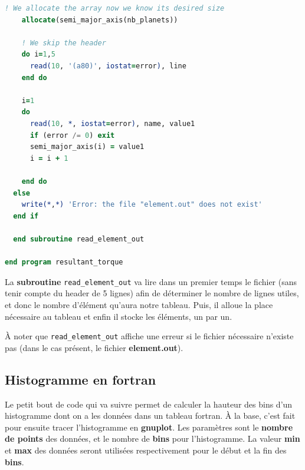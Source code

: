 \documentclass[a4paper,twoside]{article}
\begin{document}
\begin{lstlisting}[language=Fortran]
    ! We allocate the array now we know its desired size
    allocate(semi_major_axis(nb_planets))
    
    ! We skip the header
    do i=1,5
      read(10, '(a80)', iostat=error), line
    end do
    
    i=1
    do
      read(10, *, iostat=error), name, value1
      if (error /= 0) exit
      semi_major_axis(i) = value1
      i = i + 1
    
    end do
  else
    write(*,*) 'Error: the file "element.out" does not exist'
  end if
  
  end subroutine read_element_out

end program resultant_torque
\end{lstlisting}
La \textbf{subroutine} \texttt{read\_element\_out} va lire dans un premier temps le fichier (sans tenir compte du header de 5 lignes) afin de déterminer le nombre de lignes utiles, et donc le nombre d'élément qu'aura notre tableau. Puis, il alloue la place nécessaire au tableau et enfin il stocke les éléments, un par un.

À noter que \texttt{read\_element\_out} affiche une erreur si le fichier nécessaire n'existe pas (dans le cas présent, le fichier \textbf{element.out}).

\subsection{Histogramme en fortran}
Le petit bout de code qui va suivre permet de calculer la hauteur des bins d'un histogramme dont on a les données dans un tableau fortran. À la base, c'est fait pour ensuite tracer l'histogramme en \textbf{gnuplot}. Les paramètres sont le \textbf{nombre de points} des données, et le nombre de \textbf{bins} pour l'histogramme. La valeur \textbf{min} et \textbf{max} des données seront utilisées respectivement pour le début et la fin des \textbf{bins}.
\end{document}
